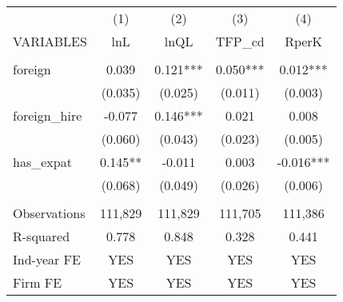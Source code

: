 \begin{tabular}{lcccc} \hline
 & (1) & (2) & (3) & (4) \\
VARIABLES & lnL & lnQL & TFP\_cd & RperK \\ \hline
 &  &  &  &  \\
foreign & 0.039 & 0.121*** & 0.050*** & 0.012*** \\
 & (0.035) & (0.025) & (0.011) & (0.003) \\
foreign\_hire & -0.077 & 0.146*** & 0.021 & 0.008 \\
 & (0.060) & (0.043) & (0.023) & (0.005) \\
has\_expat & 0.145** & -0.011 & 0.003 & -0.016*** \\
 & (0.068) & (0.049) & (0.026) & (0.006) \\
 &  &  &  &  \\
Observations & 111,829 & 111,829 & 111,705 & 111,386 \\
R-squared & 0.778 & 0.848 & 0.328 & 0.441 \\
Ind-year FE & YES & YES & YES & YES \\
 Firm FE & YES & YES & YES & YES \\ \hline
\end{tabular}
